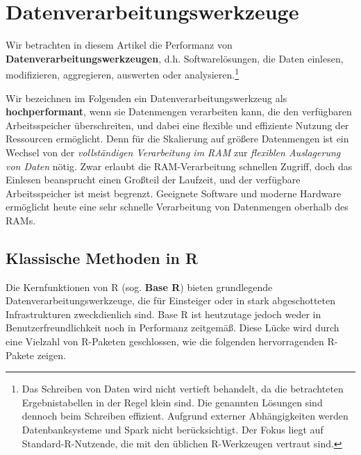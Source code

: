 \documentclass[
  german,
  10pt,
  twoside]{article}
\let\oldtextbf\textbf
\renewcommand{\textbf}[1]{{\color{wistaBlue}\oldtextbf{#1}}}
\begin{document}
\section{Datenverarbeitungswerkzeuge}\label{sec-methoden}

Wir betrachten in diesem Artikel die Performanz von
\textbf{Datenverarbeitungswerkzeugen}, d.h. Softwarelösungen, die Daten
einlesen, modifizieren, aggregieren, auswerten oder
analysieren.\footnote{Das Schreiben von Daten wird nicht vertieft
  behandelt, da die betrachteten Ergebnistabellen in der Regel klein
  sind. Die genannten Lösungen sind dennoch beim Schreiben effizient.
  Aufgrund externer Abhängigkeiten werden Datenbanksysteme und Spark
  nicht berücksichtigt. Der Fokus liegt auf Standard-R-Nutzende, die mit
  den üblichen R-Werkzeugen vertraut sind.}

Wir bezeichnen im Folgenden ein Datenverarbeitungswerkzeug als
\textbf{hochperformant}, wenn sie Datenmengen verarbeiten kann, die den
verfügbaren Arbeitsspeicher überschreiten, und dabei eine flexible und
effiziente Nutzung der Ressourcen ermöglicht. Denn für die Skalierung
auf größere Datenmengen ist ein Wechsel von der \emph{vollständigen
Verarbeitung im RAM} zur \emph{flexiblen Auslagerung von Daten} nötig.
Zwar erlaubt die RAM-Verarbeitung schnellen Zugriff, doch das Einlesen
beansprucht einen Großteil der Laufzeit, und der verfügbare
Arbeitsspeicher ist meist begrenzt. Geeignete Software und moderne
Hardware ermöglicht heute eine sehr schnelle Verarbeitung von
Datenmengen oberhalb des RAMs.

\subsection{Klassische Methoden in R}\label{klassische-methoden-in-r}

Die Kernfunktionen von R (sog. \textbf{Base R}) bieten grundlegende
Datenverarbeitungswerkzeuge, die für Einsteiger oder in stark
abgeschotteten Infrastrukturen zweckdienlich sind. Base R ist heutzutage
jedoch weder in Benutzerfreundlichkeit noch in Performanz zeitgemäß.
Diese Lücke wird durch eine Vielzahl von R-Paketen geschlossen, wie die
folgenden hervorragenden R-Pakete zeigen.
\end{document}
